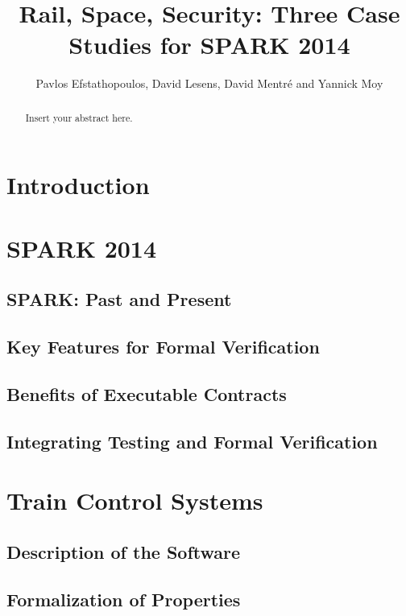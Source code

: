 \documentclass{article}
\begin{document}
\title{Rail, Space, Security: Three Case Studies for SPARK 2014}

\author{Pavlos Efstathopoulos, David Lesens, David Mentré and Yannick Moy}

\date{}

\maketitle

\begin{abstract}
Insert your abstract here.
\end{abstract}

\section{Introduction}

\section{SPARK 2014}

\subsection{SPARK: Past and Present}
\subsection{Key Features for Formal Verification}
\subsection{Benefits of Executable Contracts}
\subsection{Integrating Testing and Formal Verification}

\section{Train Control Systems}


\subsection{Description of the Software}
\subsection{Formalization of Properties}
\end{document}
